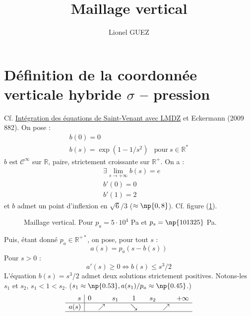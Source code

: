 \documentclass[a4paper,french]{article}
\author{Lionel GUEZ}
\title{Maillage vertical}
\begin{document}
\maketitle
\tableofcontents
\listoffigures

\section[Coordonnée verticale hybride]{Définition de la
  coordonnée verticale hybride $\sigma$ -- pression}

Cf. \href{../../..//Documentation_LMDZ/Saint_Venant_LMDZ.pdf}{Intégration
  des équations de Saint-Venant avec LMDZ} et Eckermann (2009 882). On
pose :
\begin{equation}
  \begin{array}{|ll}
    b(0) = 0 \\
    b(s) = \exp(1 - 1 / s^2) & \mathrm{pour}\ s \in \mathbb{R}^*    
  \end{array}
  \label{eq:b}
\end{equation}
$b$ est $\mathscr{C}^\infty$ sur $\mathbb{R}$, paire, strictement croissante
sur $\mathbb{R}^+$. On a :
\begin{align*}
  & \exists \lim_{s \to +\infty} b(s) = e \\
  & b'(0) = 0 \\
  & b'(1) = 2
\end{align*}
et $b$ admet un point d'inflexion en $\sqrt{6} / 3$ ($\approx
\np{0,8}$). Cf. figure (\ref{fig:disvert}).
\begin{figure}[htbp]
  \centering
  
  \caption[Maillage vertical : $a$ et $b$]{Maillage vertical. Pour
    $p_a = 5 \cdot 10^4$ Pa et $p_s = \np{101325}$ Pa.}
  \label{fig:disvert}
\end{figure}
Puis, étant donné $p_a \in \mathbb{R}^{+*}$, on pose, pour tout
$s$ :
\begin{equation}
  a(s) = p_a (s - b(s))
  \label{eq:a}
\end{equation}
Pour $s > 0$ :
\begin{displaymath}
  a'(s) \ge 0 \Leftrightarrow b(s) \le s^3 / 2
\end{displaymath}
L'équation $b(s) = s^3 / 2$ admet deux solutions strictement
positives. Notons-les $s_1$ et $s_2$, $s_1 < 1 <
s_2$. ($s_1 \approx \np{0.53}, a(s_1) / p_a \approx \np{0.45}$.)
\begin{displaymath}
  \begin{array}{r|lcccccccr}
    s & 0 & & s_1 & & 1 & & s_2 & & + \infty \\
    \hline
    a(s) & & \nearrow & & \multicolumn{3}{c}{\searrow} & & \nearrow
    & \\
    \hline
  \end{array}
\end{displaymath}
\end{document}
